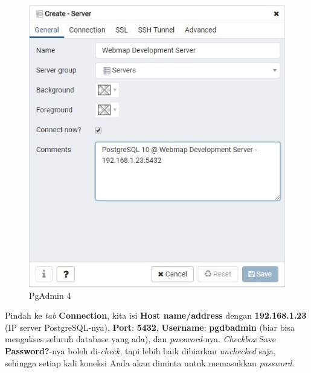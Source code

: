 \documentclass[]{book}
\begin{document}
\begin{figure}
\centering
\includegraphics{./img/pgadmin4-create-general.jpg}
\caption{PgAdmin 4}
\end{figure}

Pindah ke \emph{tab} \textbf{Connection}, kita isi \textbf{Host name/address} dengan \textbf{192.168.1.23} (IP server PostgreSQL-nya), \textbf{Port}: \textbf{5432}, \textbf{Username}: \textbf{pgdbadmin} (biar bisa mengakses seluruh database yang ada), dan \emph{password}-nya. \emph{Checkbox} Save \textbf{Password?}-nya boleh di-\emph{check}, tapi lebih baik dibiarkan \emph{unchecked} saja, sehingga setiap kali koneksi Anda akan diminta untuk memasukkan \emph{password}.
\end{document}
